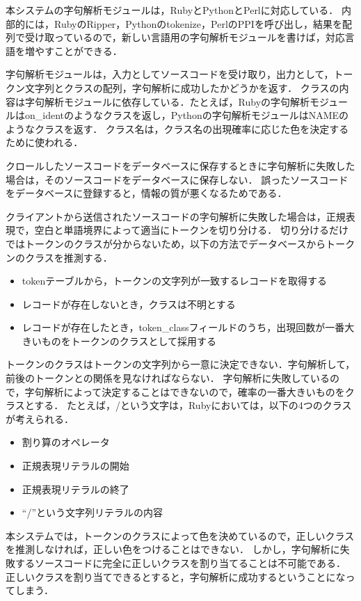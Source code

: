 \documentclass{cs-thesis}
\begin{document}
  本システムの字句解析モジュールは，RubyとPythonとPerlに対応している．
  内部的には，RubyのRipper，Pythonのtokenize，PerlのPPIを呼び出し，結果を配列で受け取っているので，新しい言語用の字句解析モジュールを書けば，対応言語を増やすことができる．

  字句解析モジュールは，入力としてソースコードを受け取り，出力として，トークン文字列とクラスの配列，字句解析に成功したかどうかを返す．
  クラスの内容は字句解析モジュールに依存している．たとえば，Rubyの字句解析モジュールはon\_identのようなクラスを返し，Pythonの字句解析モジュールはNAMEのようなクラスを返す．
  クラス名は，クラス名の出現確率に応じた色を決定するために使われる．

  クロールしたソースコードをデータベースに保存するときに字句解析に失敗した場合は，そのソースコードをデータベースに保存しない．
  誤ったソースコードをデータベースに登録すると，情報の質が悪くなるためである．

  クライアントから送信されたソースコードの字句解析に失敗した場合は，正規表現で，空白と単語境界によって適当にトークンを切り分ける．
  切り分けるだけではトークンのクラスが分からないため，以下の方法でデータベースからトークンのクラスを推測する．
  \begin{itemize}
   \item tokenテーブルから，トークンの文字列が一致するレコードを取得する
   \item レコードが存在しないとき，クラスは不明とする
   \item レコードが存在したとき，token\_classフィールドのうち，出現回数が一番大きいものをトークンのクラスとして採用する
  \end{itemize}

  トークンのクラスはトークンの文字列から一意に決定できない．字句解析して，前後のトークンとの関係を見なければならない．
  字句解析に失敗しているので，字句解析によって決定することはできないので，確率の一番大きいものをクラスとする．
  たとえば，/という文字は，Rubyにおいては，以下の4つのクラスが考えられる．
  \begin{itemize}
   \item 割り算のオペレータ
   \item 正規表現リテラルの開始
   \item 正規表現リテラルの終了
   \item ``/''という文字列リテラルの内容
  \end{itemize}

  本システムでは，トークンのクラスによって色を決めているので，正しいクラスを推測しなければ，正しい色をつけることはできない．
  しかし，字句解析に失敗するソースコードに完全に正しいクラスを割り当てることは不可能である．
  正しいクラスを割り当てできるとすると，字句解析に成功するということになってしまう．
\end{document}
